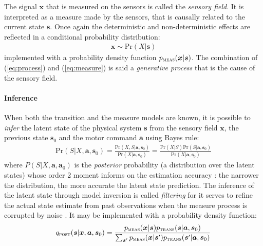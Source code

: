 \documentclass[12pt,twoside,openright]{article}
\begin{document}
The signal $\boldsymbol{x}$ that is measured on the sensors is called the \emph{sensory field}. It is interpreted as a measure made by the sensors, that is causally related to the current state $\boldsymbol{s}$. Once again the deterministic and non-deterministic effects are reflected in a conditional probability distribution:
\begin{align}
\boldsymbol{x} \sim \text{Pr}(X|\boldsymbol{s})\label{eq:measure}
\end{align}
implemented with a probability density function 
$p_\text{\sc meas}(\boldsymbol{x}|\boldsymbol{s})$.
The combination of  (\ref{eq:process}) and (\ref{eq:measure}) is said a \emph{generative process} that is the cause of the sensory field. 


\paragraph{Inference}

When both the transition and the measure models are known, it is possible to \emph{infer} the latent state of the physical system $\boldsymbol{s}$ from the sensory field $\boldsymbol{x}$, the previous state $\boldsymbol{s}_0$ and the motor command $\boldsymbol{a}$ using Bayes rule:
\begin{align}
\text{Pr}(S|X,\boldsymbol{a},\boldsymbol{s}_0) = \frac{\text{Pr}(X,S|\boldsymbol{a},\boldsymbol{s}_0)}{\text{Pr}(X|\boldsymbol{a},\boldsymbol{s}_0)} %
= \frac{\text{Pr}(X|S) \text{Pr}(S|\boldsymbol{a},\boldsymbol{s}_0)}
{\text{Pr}(X|\boldsymbol{a},\boldsymbol{s}_0)}\label{eq:post-Pr}
\end{align}
where $P(S|X,\boldsymbol{a},\boldsymbol{a}_0)$ is the \emph{posterior} probability (a distribution over the latent states) whose order 2 moment informs on the estimation accuracy : the narrower the distribution, the more accurate the latent state prediction. 
The inference of the latent state through model inversion is called \emph{filtering} for it serves to refine the actual state estimate from past observations when the measure process is corrupted by noise \cite{Kalman1960}.
It may be implemented with a probability density function:
\begin{align}
q_\text{\sc post}(\boldsymbol{s}|\boldsymbol{x},\boldsymbol{a}, \boldsymbol{s}_0) 
= \frac{p_\text{\sc meas}(\boldsymbol{x}|\boldsymbol{s}) p_\text{\sc trans}(\boldsymbol{s}|\boldsymbol{a},\boldsymbol{s}_0)}
{\sum_{\boldsymbol{s}'}p_\text{\sc meas}(\boldsymbol{x}|\boldsymbol{s}') p_\text{\sc trans}(\boldsymbol{s}'|\boldsymbol{a},\boldsymbol{s}_0)}\label{eq:post-pdf}
\end{align}
\end{document}
